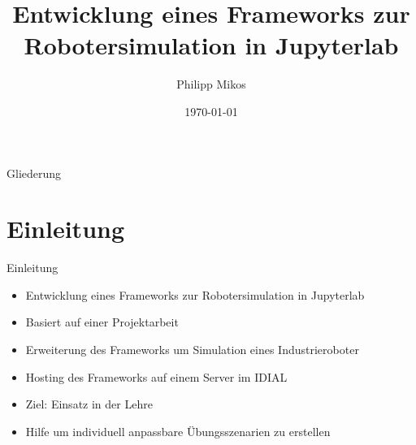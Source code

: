 \documentclass{beamer}
\title{Entwicklung eines Frameworks zur Robotersimulation in Jupyterlab}
\author{Philipp Mikos}
\date{\today}
\begin{document}
\frame{\titlepage}



\begin{frame}{Gliederung}
  \tableofcontents
\end{frame}



\section{Einleitung}
\begin{frame}{Einleitung}
  \begin{itemize}
    \setlength{\itemsep}{1em}
    \item Entwicklung eines Frameworks zur Robotersimulation in Jupyterlab
    \item Basiert auf einer Projektarbeit 
    \item Erweiterung des Frameworks um Simulation eines Industrieroboter
    \item Hosting des Frameworks auf einem Server im IDIAL
    \item Ziel: Einsatz in der Lehre
    \item Hilfe um individuell anpassbare Übungsszenarien zu erstellen
  \end{itemize}
\end{frame}


%
%
%
%
%
\end{document}
